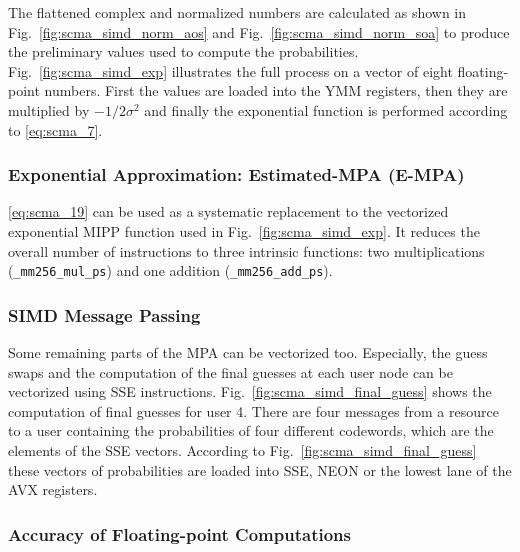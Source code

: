 The flattened complex and normalized numbers are calculated as shown in
Fig.~\ref{fig:scma_simd_norm_aos} and Fig.~\ref{fig:scma_simd_norm_soa} to
produce the preliminary values used to compute the probabilities.
Fig.~\ref{fig:scma_simd_exp} illustrates the full process on a vector of
eight floating-point numbers. First the values are loaded into the YMM
registers, then they are multiplied by $-1/2\sigma^2$ and finally the
exponential function is performed according to \eqref{eq:scma_7}.

\subsubsection{Exponential Approximation: Estimated-MPA (E-MPA)}

\eqref{eq:scma_19} can be used as a systematic replacement to the vectorized
exponential MIPP function used in Fig.~\ref{fig:scma_simd_exp}. It reduces the
overall number of instructions to three intrinsic functions: two multiplications
(\verb|_mm256_mul_ps|) and one addition (\verb|_mm256_add_ps|).

\subsubsection{SIMD Message Passing}

Some remaining parts of the MPA can be vectorized too. Especially, the guess
swaps and the computation of the final guesses at each user node can be
vectorized using SSE instructions. Fig.~\ref{fig:scma_simd_final_guess} shows
the computation of final guesses for user 4. There are four messages from a
resource to a user containing the probabilities of four different codewords,
which are the elements of the SSE vectors. According to
Fig.~\ref{fig:scma_simd_final_guess} these vectors of probabilities are loaded
into SSE, NEON or the lowest lane of the AVX registers.

\subsubsection{Accuracy of Floating-point Computations}
\label{sec:opt_scma_float}

